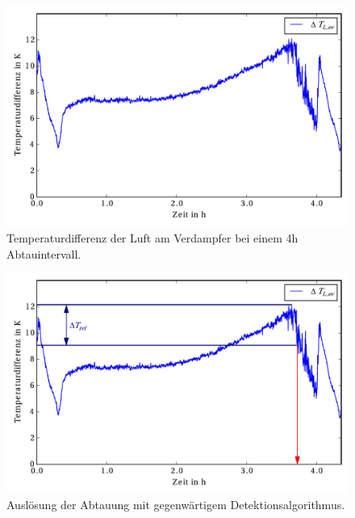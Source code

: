 \begin{figure}[h]
\centering
\includegraphics[scale=0.8]{Pictures/50/delTaT_evap1.pdf}
\caption{Temperaturdifferenz der Luft am Verdampfer bei einem 4h Abtauintervall.}
\label{fig:deltaTLuftevap50}
\end{figure}

\begin{figure}[h]
\centering
\includegraphics[scale=0.8]{Pictures/50/delTaT_evap1bad.pdf}
\caption{Auslösung der Abtauung mit gegenwärtigem Detektionsalgorithmus.}
\label{fig:deltaTLuftevap50bad}
\end{figure}

